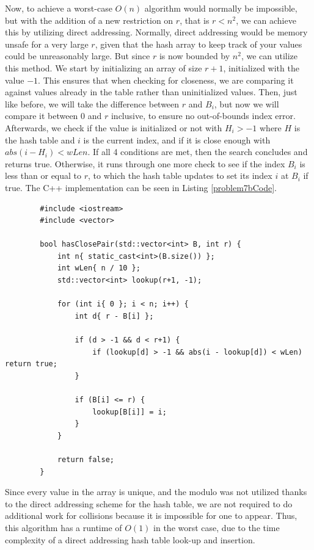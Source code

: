 \documentclass{report}
\begin{document}
Now, to achieve a worst-case $O(n)$ algorithm would normally be impossible, but with the addition of a new restriction on $r$, that is $r < n^2$, we can achieve this by utilizing direct addressing. Normally, direct addressing would be memory unsafe for a very large $r$, given that the hash array to keep track of your values could be unreasonably large. But since $r$ is now bounded by $n^2$, we can utilize this method. We start by initializing an array of size $r+1$, initialized with the value $-1$. This ensures that when checking for closeness, we are comparing it against values already in the table rather than uninitialized values. Then, just like before, we will take the difference between $r$ and $B_i$, but now we will compare it between $0$ and $r$ inclusive, to ensure no out-of-bounds index error. Afterwards, we check if the value is initialized or not with $H_i > -1$ where $H$ is the hash table and $i$ is the current index, and if it is close enough with $abs(i - H_i) < wLen$. If all 4 conditions are met, then the search concludes and returns true. Otherwise, it runs through one more check to see if the index $B_i$ is less than or equal to $r$, to which the hash table updates to set its index $i$ at $B_i$ if true. The C++ implementation can be seen in Listing \ref{problem7bCode}.
\begin{listing}[h]
	\begin{verbatim}
		#include <iostream>
		#include <vector>
		
		bool hasClosePair(std::vector<int> B, int r) {
			int n{ static_cast<int>(B.size()) };
			int wLen{ n / 10 };
			std::vector<int> lookup(r+1, -1);
			
			for (int i{ 0 }; i < n; i++) {
				int d{ r - B[i] };
				
				if (d > -1 && d < r+1) {
					if (lookup[d] > -1 && abs(i - lookup[d]) < wLen) return true;
				}
				
				if (B[i] <= r) {
					lookup[B[i]] = i;
				}
			}
			
			return false;
		}
	\end{verbatim}
	\caption{C++ implementation of the algorithm for part B.}
	\label{problem7bCode}
\end{listing}
Since every value in the array is unique, and the modulo was not utilized thanks to the direct addressing scheme for the hash table, we are not required to do additional work for collisions because it is impossible for one to appear. Thus, this algorithm has a runtime of $O(1)$ in the worst case, due to the time complexity of a direct addressing hash table look-up and insertion.

\printbibliography
\end{document}
